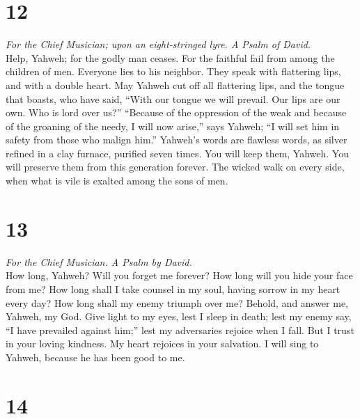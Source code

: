 \hypertarget{section-11}{%
\section{12}\label{section-11}}

\emph{For the Chief Musician; upon an eight-stringed lyre. A Psalm of
David.}\\
 Help, Yahweh; for the godly man ceases. For the faithful
fail from among the children of men.  Everyone lies to his
neighbor. They speak with flattering lips, and with a double heart.
 May Yahweh cut off all flattering lips, and the tongue
that boasts,  who have said, ``With our tongue we will
prevail. Our lips are our own. Who is lord over us?'' 
``Because of the oppression of the weak and because of the groaning of
the needy, I will now arise,'' says Yahweh; ``I will set him in safety
from those who malign him.''  Yahweh's words are flawless
words, as silver refined in a clay furnace, purified seven times.
 You will keep them, Yahweh. You will preserve them from
this generation forever.  The wicked walk on every side,
when what is vile is exalted among the sons of men.

\hypertarget{section-12}{%
\section{13}\label{section-12}}

\emph{For the Chief Musician. A Psalm by David.}\\
 How long, Yahweh? Will you forget me forever? How long
will you hide your face from me?  How long shall I take
counsel in my soul, having sorrow in my heart every day? How long shall
my enemy triumph over me?  Behold, and answer me, Yahweh,
my God. Give light to my eyes, lest I sleep in death; 
lest my enemy say, ``I have prevailed against him;'' lest my adversaries
rejoice when I fall.  But I trust in your loving kindness.
My heart rejoices in your salvation.  I will sing to
Yahweh, because he has been good to me.

\hypertarget{section-13}{%
\section{14}\label{section-13}}

